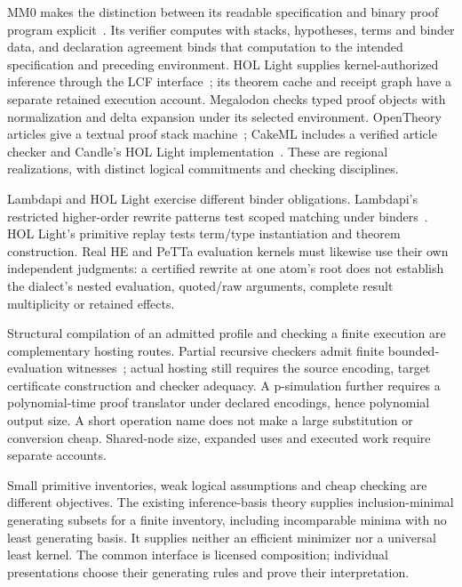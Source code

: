 \documentclass[11pt,a4paper]{article}
\begin{document}
MM0 makes the distinction between its readable specification and binary proof
program explicit~\cite{MM0}. Its verifier computes with stacks, hypotheses,
terms and binder data, and declaration agreement binds that computation to
the intended specification and preceding environment. HOL Light supplies
kernel-authorized inference through the LCF interface~\cite{HOLLight}; its
theorem cache and receipt graph have a separate retained execution account.
Megalodon checks typed proof objects with normalization and delta expansion
under its selected environment. OpenTheory articles give a textual proof
stack machine~\cite{OpenTheoryArticle}; CakeML includes a verified article
checker and Candle's HOL Light implementation~\cite{CakeMLProofMachines}.
These are regional realizations, with distinct logical commitments and
checking disciplines.

Lambdapi and HOL Light exercise different binder obligations. Lambdapi's
restricted higher-order rewrite patterns test scoped matching under
binders~\cite{LambdapiRules}. HOL Light's primitive replay tests term/type
instantiation and theorem construction. Real HE and PeTTa evaluation kernels
must likewise use their own independent judgments: a certified rewrite at one
atom's root does not establish the dialect's nested evaluation, quoted/raw
arguments, complete result multiplicity or retained effects.

Structural compilation of an admitted profile and checking a finite execution
are complementary hosting routes. Partial recursive checkers admit finite
bounded-evaluation witnesses~\cite{MathlibPartrecCode}; actual hosting still
requires the source encoding, target certificate construction and checker
adequacy. A p-simulation further requires a polynomial-time proof translator
under declared encodings, hence polynomial output size. A short operation
name does not make a large substitution or conversion cheap. Shared-node
size, expanded uses and executed work require separate accounts.

Small primitive inventories, weak logical assumptions and cheap checking are
different objectives. The existing inference-basis theory supplies
inclusion-minimal generating subsets for a finite inventory, including
incomparable minima with no least generating basis. It supplies neither an
efficient minimizer nor a universal least kernel. The common interface is
licensed composition; individual presentations choose their generating rules
and prove their interpretation.
\end{document}
